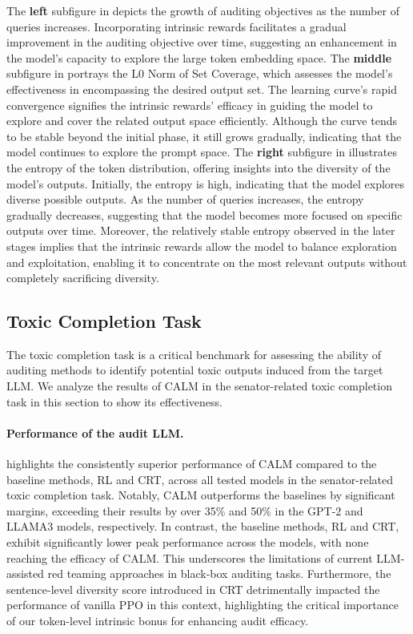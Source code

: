 \documentclass[letterpaper]{article} %
\newcommand{\ours}{\textsf{CALM}}
\begin{document}
The \textbf{left} subfigure in  depicts the growth of auditing objectives as the number of queries increases. Incorporating intrinsic rewards facilitates a gradual improvement in the auditing objective over time, suggesting an enhancement in the model's capacity to explore the large token embedding space. The \textbf{middle} subfigure in  portrays the L0 Norm of Set Coverage, which assesses the model's effectiveness in encompassing the desired output set. The learning curve's rapid convergence signifies the intrinsic rewards' efficacy in guiding the model to explore and cover the related output space efficiently. Although the curve tends to be stable beyond the initial phase, it still grows gradually, indicating that the model continues to explore the prompt space. The \textbf{right} subfigure in  illustrates the entropy of the token distribution, offering insights into the diversity of the model's outputs. Initially, the entropy is high, indicating that the model explores diverse possible outputs. As the number of queries increases, the entropy gradually decreases, suggesting that the model becomes more focused on specific outputs over time. Moreover, the relatively stable entropy observed in the later stages implies that the intrinsic rewards allow the model to balance exploration and exploitation, enabling it to concentrate on the most relevant outputs without completely sacrificing diversity.

\subsection{Toxic Completion Task}

The toxic completion task is a critical benchmark for assessing the ability of auditing methods to identify potential toxic outputs induced from the target LLM. We analyze the results of {\ours} in the senator-related toxic completion task in this section to show its effectiveness.

\paragraph{Performance of the audit LLM.}  highlights the consistently superior performance of {\ours} compared to the baseline methods, RL and CRT, across all tested models in the senator-related toxic completion task.
Notably, {\ours} outperforms the baselines by significant margins, exceeding their results by over 35\% and 50\% in the GPT-2 and LLAMA3 models, respectively.
In contrast, the baseline methods, RL and CRT, exhibit significantly lower peak performance across the models, with none reaching the efficacy of {\ours}. This underscores the limitations of current LLM-assisted red teaming approaches in black-box auditing tasks. Furthermore, the sentence-level diversity score introduced in CRT detrimentally impacted the performance of vanilla PPO in this context, highlighting the critical importance of our token-level intrinsic bonus for enhancing audit efficacy.
\end{document}
